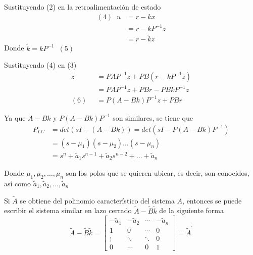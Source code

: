 Sustituyendo (2) en la retroalimentación de estado
\[
    \begin{split}
       (4) \;\; u & = r - kx \\
        & = r - kP^{-1}z \\
        & = r - \tilde{k}z
    \end{split}
\]
Donde \( \tilde{k}=kP^{-1} \;\; (5) \)

Sustituyendo (4) en (3)
\[
    \begin{split}
        \dot{z} & = PAP^{-1}z + PB(r-kP^{-1}z) \\
        & = PAP^{-1}z + PBr - PBkP^{-1}z \\
      (6) \;\;  & = P(A-Bk)P^{-1}z + PBr
    \end{split}
\]

Ya que \( A-Bk \) y \(P(A-Bk)P^{-1}\) son similares, se tiene que
\[
    \begin{split}
        P_{LC} & = det(sI-(A-Bk)) = det(sI-P(A-Bk)P^{-1}) \\
        & = (s-\mu_{1}) (s-\mu_{2}) \ldots (s-\mu_{n}) \\
        & = s^{n} +\tilde{a}_{1}s^{n-1} + \tilde{a}_{2}s^{n-2} + \ldots + \tilde{a}_{n}
    \end{split}
\]

Donde \( \mu_{1}, \mu_{2}, \ldots, \mu_{n} \) son los polos que se quieren ubicar, es decir, son conocidos, así como \( \tilde{a}_{1},\tilde{a}_{2}, \ldots, \tilde{a}_{n} \)

Si \( \tilde{A} \) se obtiene del polinomio característico del sistema \( A \), entonces se puede escribir el sistema similar en lazo cerrado \( \tilde{A}-\tilde{B}\tilde{k} \) de la siguiente forma
\[
    \tilde{A}-\tilde{B}\tilde{k} =
    \begin{bmatrix}
        -\tilde{a}_{1} & -\tilde{a}_{2} & \cdots & -\tilde{a}_{n} \\
        1 & 0 & \cdots & 0 \\
        \vdots & \ddots & \ddots & 0 \\
        0 & \cdots & 0 & 1
    \end{bmatrix} = \tilde{A}^{'}
\]

